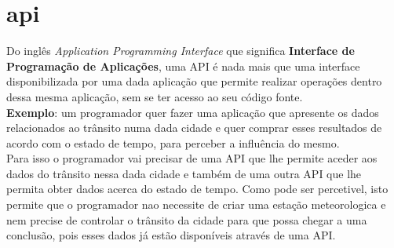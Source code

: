 \section{api}
Do inglês \textit{Application Programming Interface} que significa \textbf{Interface de Programação de Aplicações}, uma API é nada mais que uma interface disponibilizada por uma dada aplicação que permite realizar operações dentro dessa mesma aplicação, sem se ter acesso ao seu código fonte.\newline \\
\textbf{Exemplo}: um programador quer fazer uma aplicação que apresente os dados relacionados ao trânsito numa dada cidade e quer comprar esses resultados de acordo com o estado de tempo, para perceber a influência do mesmo.\newline \\
Para isso o programador vai precisar de uma API que lhe permite aceder aos dados do trânsito nessa dada cidade e também de uma outra API que lhe permita obter dados acerca do estado de tempo.\newline
Como pode ser percetivel, isto permite que o programador nao necessite de criar uma estação meteorologica e nem precise de controlar o trânsito da cidade para que possa chegar a uma conclusão, pois esses dados já estão disponíveis através de uma API.


